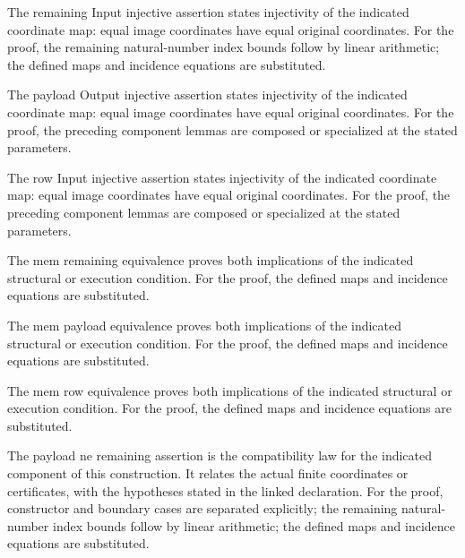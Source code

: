 The remaining Input injective assertion states injectivity of the indicated coordinate map: equal image coordinates have equal original coordinates.
For the proof, the remaining natural-number index bounds follow by linear arithmetic; the defined maps and incidence equations are substituted.
\par{}

The payload Output injective assertion states injectivity of the indicated coordinate map: equal image coordinates have equal original coordinates.
For the proof, the preceding component lemmas are composed or specialized at the stated parameters.
\par{}

The row Input injective assertion states injectivity of the indicated coordinate map: equal image coordinates have equal original coordinates.
For the proof, the preceding component lemmas are composed or specialized at the stated parameters.
\par{}

The mem remaining equivalence proves both implications of the indicated structural or execution condition.
For the proof, the defined maps and incidence equations are substituted.
\par{}

The mem payload equivalence proves both implications of the indicated structural or execution condition.
For the proof, the defined maps and incidence equations are substituted.
\par{}

The mem row equivalence proves both implications of the indicated structural or execution condition.
For the proof, the defined maps and incidence equations are substituted.
\par{}

The payload ne remaining assertion is the compatibility law for the indicated component of this construction. It relates the actual finite coordinates or certificates, with the hypotheses stated in the linked declaration.
For the proof, constructor and boundary cases are separated explicitly; the remaining natural-number index bounds follow by linear arithmetic; the defined maps and incidence equations are substituted.
\par{}


